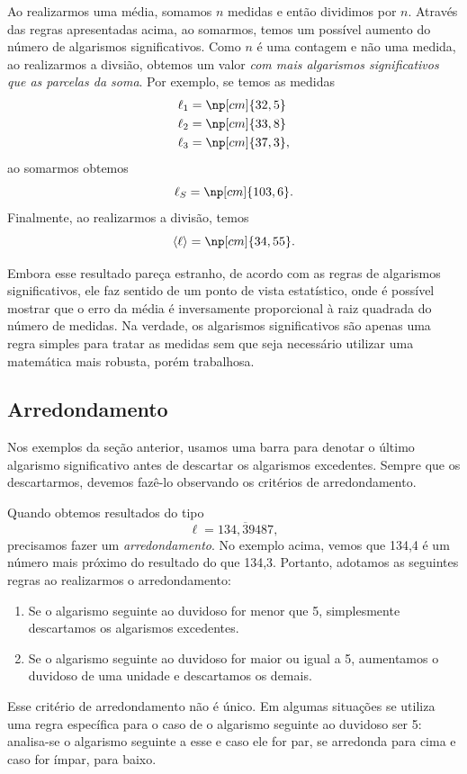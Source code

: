 Ao realizarmos uma média, somamos $n$ medidas e então dividimos por $n$. Através das regras apresentadas acima, ao somarmos, temos um possível aumento do número de algarismos significativos. Como $n$ é uma contagem e não uma medida, ao realizarmos a divsião, obtemos um valor \emph{com mais algarismos significativos que as parcelas da soma}. Por exemplo, se temos as medidas
\begin{align}
	\ell_1 &= \np[cm]{32,5} \\
	\ell_2 &= \np[cm]{33,8} \\
	\ell_3 &= \np[cm]{37,3},
\end{align}
%
ao somarmos obtemos
\begin{equation}
	\ell_S = \np[cm]{103,6}.
\end{equation}
%
Finalmente, ao realizarmos a divisão, temos
\begin{equation}
	\mean{\ell} = \np[cm]{34,55}.
\end{equation}

Embora esse resultado pareça estranho, de acordo com as regras de algarismos significativos, ele faz sentido de um ponto de vista estatístico, onde é possível mostrar que o erro da média é inversamente proporcional à raiz quadrada do número de medidas. Na verdade, os algarismos significativos são apenas uma regra simples para tratar as medidas sem que seja necessário utilizar uma matemática mais robusta, porém trabalhosa.

\subsection{Arredondamento}

Nos exemplos da seção anterior, usamos uma barra para denotar o último algarismo significativo antes de descartar os algarismos excedentes. Sempre que os descartarmos, devemos fazê-lo observando os critérios de arredondamento.

Quando obtemos resultados do tipo
\begin{equation}
     \ell = 134,\overline{3}9487,
\end{equation}
%
precisamos fazer um \emph{arredondamento}. No exemplo acima, vemos que 134,4 é um número mais próximo do resultado do que 134,3. Portanto, adotamos as seguintes regras ao realizarmos o arredondamento:
\begin{enumerate}
     \item Se o algarismo seguinte ao duvidoso for menor que 5, simplesmente descartamos os algarismos excedentes.
     \item Se o algarismo seguinte ao duvidoso for maior ou igual a 5, aumentamos o duvidoso de uma unidade e descartamos os demais.
\end{enumerate}
%
Esse critério de arredondamento não é único. Em algumas situações se utiliza uma regra específica para o caso de o algarismo seguinte ao duvidoso ser 5: analisa-se o algarismo seguinte a esse e caso ele for par, se arredonda para cima e caso for ímpar, para baixo.

